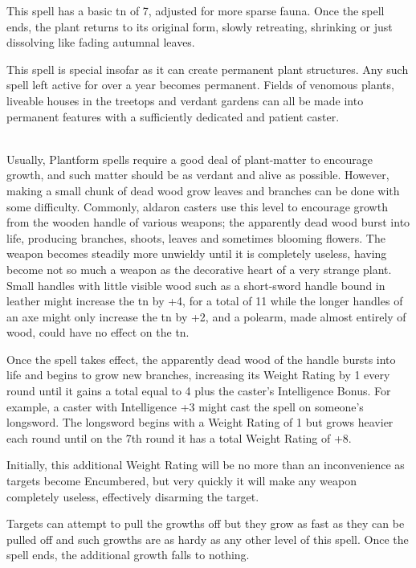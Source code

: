 \documentclass[titlepage,a4paper,openany]{book}
\begin{document}
\begin{multicols}{2}
This spell has a basic \gls{tn} of 7, adjusted for more sparse fauna. Once the spell ends, the plant returns to its original form, slowly retreating, shrinking or just dissolving like fading autumnal leaves.

This spell is special insofar as it can create permanent plant structures. Any such spell left active for over a year becomes permanent. Fields of venomous plants, liveable houses in the treetops and verdant gardens can all be made into permanent features with a sufficiently dedicated and patient caster.

\\
Usually, Plantform spells require a good deal of plant-matter to encourage growth, and such matter should be as verdant and alive as possible. However, making a small chunk of dead wood grow leaves and branches can be done with some difficulty. Commonly, aldaron casters use this level to encourage growth from the wooden handle of various weapons; the apparently dead wood burst into life, producing branches, shoots, leaves and sometimes blooming flowers. The weapon becomes steadily more unwieldy until it is completely useless, having become not so much a weapon as the decorative heart of a very strange plant. Small handles with little visible wood such as a short-sword handle bound in leather might increase the \gls{tn} by +4, for a total of 11 while the longer handles of an axe might only increase the \gls{tn} by +2, and a polearm, made almost entirely of wood, could have no effect on the \gls{tn}.

Once the spell takes effect, the apparently dead wood of the handle bursts into life and begins to grow new branches, increasing its Weight Rating by 1 every \gls{round} until it gains a total equal to 4 plus the caster's Intelligence Bonus. For example, a caster with Intelligence +3 might cast the spell on someone's longsword. The longsword begins with a Weight Rating of 1 but grows heavier each \gls{round} until on the 7th \gls{round} it has a total Weight Rating of +8.

Initially, this additional Weight Rating will be no more than an inconvenience as targets become Encumbered, but very quickly it will make any weapon completely useless, effectively disarming the target.

Targets can attempt to pull the growths off but they grow as fast as they can be pulled off and such growths are as hardy as any other level of this spell. Once the spell ends, the additional growth falls to nothing.


\end{multicols}
\end{document}
